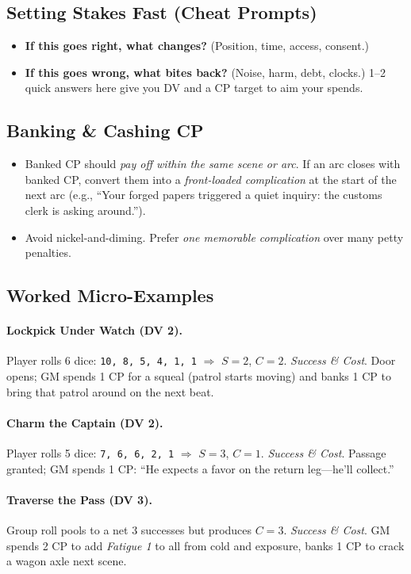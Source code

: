 \documentclass[12pt]{book}
\begin{document}
\subsection{Setting Stakes Fast (Cheat Prompts)}
\begin{itemize}
  \item \textbf{If this goes right, what changes?} (Position, time, access, consent.)
  \item \textbf{If this goes wrong, what bites back?} (Noise, harm, debt, clocks.)
  1--2 quick answers here give you DV and a CP target to aim your spends.
\end{itemize}

\subsection{Banking \& Cashing CP}
\begin{itemize}
  \item Banked CP should \emph{pay off within the same scene or arc}. If an arc closes with banked CP, convert them into a \emph{front-loaded complication} at the start of the next arc (e.g., “Your forged papers triggered a quiet inquiry: the customs clerk is asking around.”).
  \item Avoid nickel-and-diming. Prefer \emph{one memorable complication} over many petty penalties.
\end{itemize}

\subsection{Worked Micro-Examples}
\paragraph{Lockpick Under Watch (DV 2).}
Player rolls 6 dice: \texttt{10, 8, 5, 4, 1, 1} $\Rightarrow$ $S{=}2$, $C{=}2$. \emph{Success \& Cost}. Door opens; GM spends 1 CP for a squeal (patrol starts moving) and banks 1 CP to bring that patrol around on the next beat.

\paragraph{Charm the Captain (DV 2).}
Player rolls 5 dice: \texttt{7, 6, 6, 2, 1} $\Rightarrow$ $S{=}3$, $C{=}1$. \emph{Success \& Cost}. Passage granted; GM spends 1 CP: “He expects a favor on the return leg—he’ll collect.”

\paragraph{Traverse the Pass (DV 3).}
Group roll pools to a net 3 successes but produces $C{=}3$. \emph{Success \& Cost}. GM spends 2 CP to add \emph{Fatigue 1} to all from cold and exposure, banks 1 CP to crack a wagon axle next scene.
\end{document}
